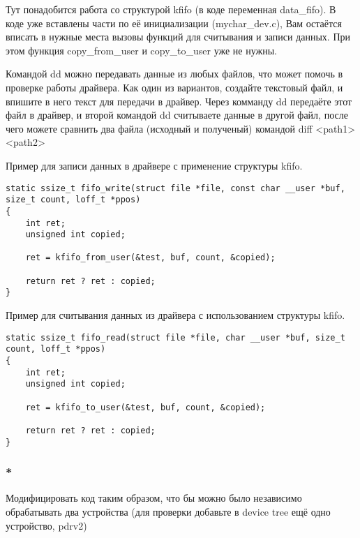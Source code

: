 Тут понадобится работа со структурой kfifo (в коде переменная data\_fifo). В коде уже вставлены части по её инициализации (mychar\_dev.c), Вам остаётся вписать в нужные места вызовы функций для считывания и записи данных. При этом функция copy\_from\_user и copy\_to\_user уже не нужны.

Командой dd можно передавать данные из любых файлов, что может помочь в проверке работы драйвера. Как один из вариантов, создайте текстовый файл, и впишите в него текст для передачи в драйвер. Через комманду dd передаёте этот файл в драйвер, и второй командой dd считываете данные в другой файл, после чего можете сравнить два файла (исходный и полученый) командой diff <path1> <path2>

Пример для записи данных в драйвере с применение структуры kfifo.
\begin{lstlisting}[style=stdout]
static ssize_t fifo_write(struct file *file, const char __user *buf, size_t count, loff_t *ppos)
{
	int ret;
	unsigned int copied;
	
	ret = kfifo_from_user(&test, buf, count, &copied);
	
	return ret ? ret : copied;
}
\end{lstlisting}


Пример для считывания данных из драйвера с использованием структуры kfifo.
\begin{lstlisting}[style=stdout]
static ssize_t fifo_read(struct file *file, char __user *buf, size_t count, loff_t *ppos)
{
	int ret;
	unsigned int copied;
	
	ret = kfifo_to_user(&test, buf, count, &copied);
	
	return ret ? ret : copied;
}
\end{lstlisting}

\subsubsection{*} Модифицировать код таким образом, что бы  можно было независимо обрабатывать два устройства (для проверки добавьте в device tree ещё одно устройство, pdrv2)
